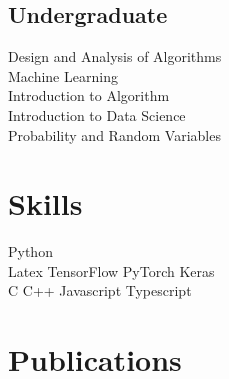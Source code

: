 \documentclass[]{deedy-resume-openfont}
\begin{document}
\begin{minipage}[t]{0.33\textwidth}
\subsection{Undergraduate}
Design and Analysis of Algorithms\\
Machine Learning \\
Introduction to Algorithm \\
Introduction to Data Science \\
Probability and Random Variables\\


\section{Skills}
Python \\ 
Latex \textbullet{} TensorFlow \textbullet{} PyTorch \textbullet{} Keras\\
C \textbullet{} C++ \textbullet{} Javascript \textbullet{} Typescript  \\

\section{Publications} 
\renewcommand\refname{\vskip -1.5em} %


\nocite{*}

%
%

\end{minipage} 
\hfill
\end{document}
